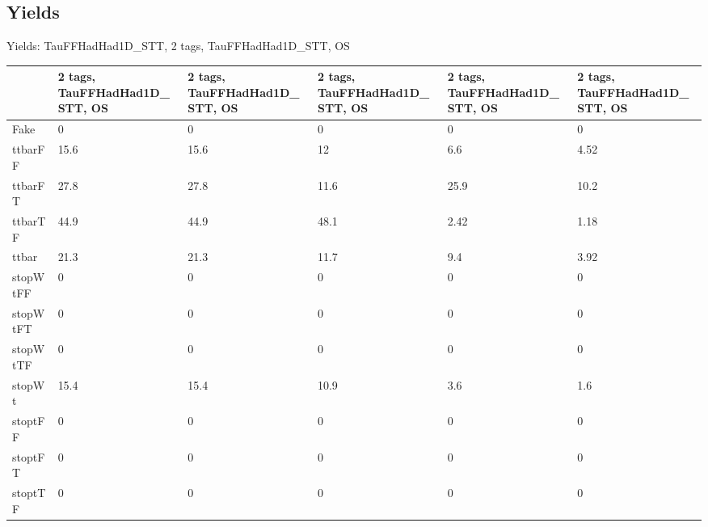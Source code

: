 
\subsection{Yields}

\begin{frame}{Yields: TauFFHadHad1D\_STT, 2 tags, TauFFHadHad1D\_STT, OS}
\begin{center}
  \begin{tabular}{l| >{\centering\let\newline\\\arraybackslash\hspace{0pt}}m{1.4cm}| >{\centering\let\newline\\\arraybackslash\hspace{0pt}}m{1.4cm}| >{\centering\let\newline\\\arraybackslash\hspace{0pt}}m{1.4cm}| >{\centering\let\newline\\\arraybackslash\hspace{0pt}}m{1.4cm}| >{\centering\let\newline\\\arraybackslash\hspace{0pt}}m{1.4cm}}
    & 2 tags, TauFFHadHad1D\_STT, OS & 2 tags, TauFFHadHad1D\_STT, OS & 2 tags, TauFFHadHad1D\_STT, OS & 2 tags, TauFFHadHad1D\_STT, OS & 2 tags, TauFFHadHad1D\_STT, OS \\
 \hline \hline
    Fake& 0 & 0 & 0 & 0 & 0 \\
 \hline
    ttbarFF& 15.6 & 15.6 & 12 & 6.6 & 4.52 \\
 \hline
    ttbarFT& 27.8 & 27.8 & 11.6 & 25.9 & 10.2 \\
 \hline
    ttbarTF& 44.9 & 44.9 & 48.1 & 2.42 & 1.18 \\
 \hline
    ttbar& 21.3 & 21.3 & 11.7 & 9.4 & 3.92 \\
 \hline
    stopWtFF& 0 & 0 & 0 & 0 & 0 \\
 \hline
    stopWtFT& 0 & 0 & 0 & 0 & 0 \\
 \hline
    stopWtTF& 0 & 0 & 0 & 0 & 0 \\
 \hline
    stopWt& 15.4 & 15.4 & 10.9 & 3.6 & 1.6 \\
 \hline
    stoptFF& 0 & 0 & 0 & 0 & 0 \\
 \hline
    stoptFT& 0 & 0 & 0 & 0 & 0 \\
 \hline
    stoptTF& 0 & 0 & 0 & 0 & 0 \\

\end{tabular}
\end{center}
\end{frame}
